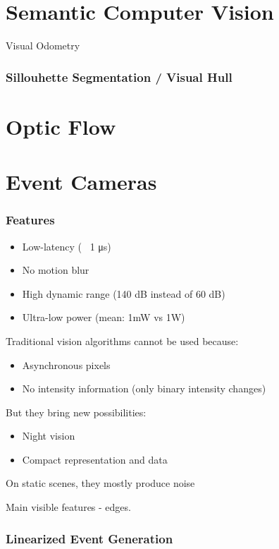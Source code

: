 \section{Semantic Computer Vision} 

Visual Odometry

\subsubsection{Sillouhette Segmentation / Visual Hull}

\section{Optic Flow}

\section{Event Cameras}

\subsubsection{Features}

\begin{itemize}
\item Low-latency (~ 1 μs)
\item No motion blur
\item High dynamic range (140 dB instead of 60 dB)
\item Ultra-low power (mean: 1mW vs 1W)
\end{itemize}

Traditional vision algorithms cannot be used because:
\begin{itemize}
\item Asynchronous pixels
\item No intensity information (only binary intensity changes)
\end{itemize}

But they bring new possibilities:
\begin{itemize}
\item Night vision
\item Compact representation and data
\end{itemize}

On static scenes, they mostly produce noise

Main visible features - edges. 

\subsubsection{Linearized Event Generation}

